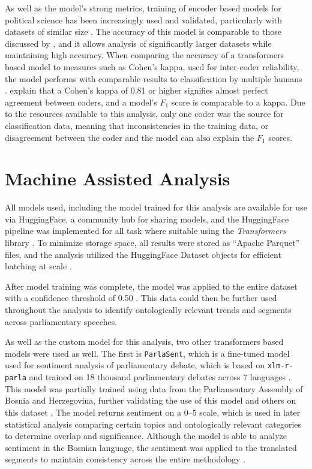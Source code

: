 As well as the model's strong metrics, training of encoder based models for political science has been increasingly used and validated, particularly with datasets of similar size \citep[pg.~85-87]{laurer2024}. The accuracy of this model is comparable to those discussed by \citet[pg.~85]{laurer2024}, and it allows analysis of significantly larger datasets while maintaining high accuracy. When comparing the accuracy of a transformers based model to measures such as Cohen's kappa, used for inter-coder reliability, the model performs with comparable results to classification by multiple humans \citep[pg.~140-141]{coleman2024}. \citet[pg.~141]{coleman2024} explain that a Cohen's kappa of 0.81 or higher signifies almost perfect agreement between coders, and a model's $F_1$ score is comparable to a kappa. Due to the resources available to this analysis, only one coder was the source for classification data, meaning that inconsistencies in the training data, or disagreement between the coder and the model can also explain the $F_1$ scores.

\section{Machine Assisted Analysis}
\label{sec:maching_analysis}

All models used, including the model trained for this analysis are available for use via HuggingFace, a community hub for sharing models, and the HuggingFace pipeline was implemented for all task where suitable using the \textit{Transformers} library \citep[pg.~38-39]{wolf2020}. To minimize storage space, all results were stored as ``Apache Parquet'' files, and the analysis utilized the HuggingFace Dataset objects for efficient batching at scale \citep[pg.~38-39]{parquet2025, wolf2020}.

After model training was complete, the model was applied to the entire dataset with a confidence threshold of 0.50 \citep[pg.~5]{pungersek2026}. This data could then be further used throughout the analysis to identify ontologically relevant trends and segments across parliamentary speeches.

As well as the custom model for this analysis, two other transformers based models were used as well. The first is \texttt{ParlaSent}, which is a fine-tuned model used for sentiment analysis of parliamentary debate, which is based on \texttt{xlm-r-parla} and trained on 18 thousand parliamentary debates across 7 languages \citep{mochtak2025}. This model was partially trained using data from the Parliamentary Assembly of Bosnia and Herzegovina, further validating the use of this model and others on this dataset \citep[pg.~4-5]{mochtak2025}. The model returns sentiment on a 0--5 scale, which is used in later statistical analysis comparing certain topics and ontologically relevant categories to determine overlap and significance. Although the model is able to analyze sentiment in the Bosnian language, the sentiment was applied to the translated segments to maintain consistency across the entire methodology \citep[pg.~6]{mochtak2025}.


